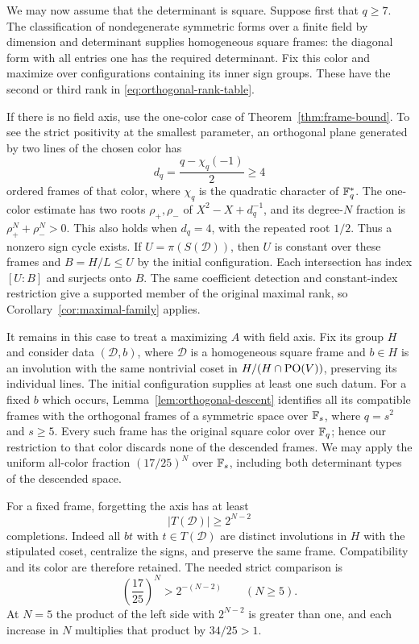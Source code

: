We may now assume that the determinant is square.  Suppose first that
$q\ge7$.  The classification of nondegenerate symmetric forms over a
finite field by dimension and determinant supplies homogeneous square
frames: the diagonal form with all entries one has the required
determinant.  Fix this color and maximize over configurations containing
its inner sign groups.  These have the second or third rank in
\eqref{eq:orthogonal-rank-table}.

If there is no field axis, use the one-color case of
Theorem~\ref{thm:frame-bound}.  To see the strict positivity at the
smallest parameter, an orthogonal plane generated by two lines of the
chosen color has
\[
 d_q=\frac{q-\chi_q(-1)}2\ge4
\]
 ordered frames of that color, where $\chi_q$ is the quadratic character
 of $\mathbb F_q^*$.  The one-color estimate has two roots
$\rho_+,\rho_-$ of $X^2-X+d_q^{-1}$, and its degree-$N$ fraction is
$\rho_+^N+\rho_-^N>0$.  This also holds when $d_q=4$, with the repeated
root $1/2$.  Thus a nonzero sign cycle exists.  If
$U=\pi(S(\mathcal D))$, then $U$ is constant over these frames and
$B=H/L\le U$ by the initial configuration.  Each intersection has
index $[U:B]$ and surjects onto $B$. The same coefficient detection and
constant-index restriction give a supported member of the original maximal rank, so
Corollary~\ref{cor:maximal-family} applies.

It remains in this case to treat a maximizing $A$ with field axis.
Fix its group $H$ and consider data $(\mathcal D,b)$, where
$\mathcal D$ is a homogeneous square frame and $b\in H$ is an
involution with the same nontrivial coset in
$H/(H\cap\operatorname{PO}(V))$, preserving its individual lines.  The initial
configuration supplies at least one such datum.  For a fixed $b$ which
occurs, Lemma~\ref{lem:orthogonal-descent} identifies all its compatible
frames with the orthogonal frames of a symmetric space over
$\mathbb F_s$, where $q=s^2$ and $s\ge5$.  Every such frame has the original
square color over $\mathbb F_q$; hence our restriction to that color discards
none of the descended frames.  We may apply the uniform all-color
fraction $(17/25)^N$ over $\mathbb F_s$, including both determinant types of
the descended space.

For a fixed frame, forgetting the axis has at least
\begin{equation}\label{eq:orthogonal-field-completions}
 |T(\mathcal D)|\ge 2^{N-2}
\end{equation}
completions.  Indeed all $bt$ with $t\in T(\mathcal D)$ are distinct
involutions in $H$ with the stipulated coset, centralize the signs, and
preserve the same frame.  Compatibility and its color are therefore
retained.  The needed strict comparison is
\begin{equation}\label{eq:orthogonal-field-inequality}
 \left(\frac{17}{25}\right)^N>2^{-(N-2)}\qquad(N\ge5).
\end{equation}
At $N=5$ the product of the left side with $2^{N-2}$ is greater than
one, and each increase in $N$ multiplies that product by $34/25>1$.

